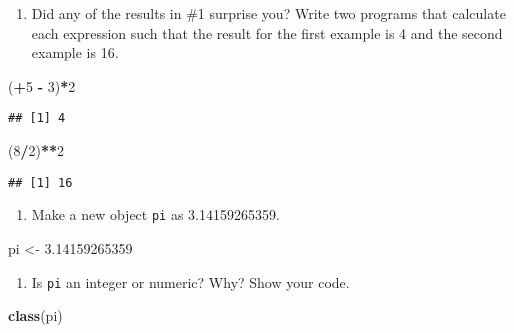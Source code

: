 \documentclass[]{article}
\newenvironment{Shaded}{\begin{snugshade}}{\end{snugshade}}
\newcommand{\DecValTok}[1]{\textcolor[rgb]{0.00,0.00,0.81}{#1}}
\newcommand{\FloatTok}[1]{\textcolor[rgb]{0.00,0.00,0.81}{#1}}
\newcommand{\KeywordTok}[1]{\textcolor[rgb]{0.13,0.29,0.53}{\textbf{#1}}}
\newcommand{\NormalTok}[1]{#1}
\newcommand{\OperatorTok}[1]{\textcolor[rgb]{0.81,0.36,0.00}{\textbf{#1}}}
\newcommand{\StringTok}[1]{\textcolor[rgb]{0.31,0.60,0.02}{#1}}
\providecommand{\tightlist}{%
  \setlength{\itemsep}{0pt}\setlength{\parskip}{0pt}}
\begin{document}
\begin{enumerate}
\def\labelenumi{\arabic{enumi}.}
\setcounter{enumi}{1}
\tightlist
\item
  Did any of the results in \#1 surprise you? Write two programs that
  calculate each expression such that the result for the first example
  is 4 and the second example is 16.
\end{enumerate}

\begin{Shaded}
\begin{Highlighting}[]
\NormalTok{(}\OperatorTok{+}\DecValTok{5} \OperatorTok{-}\StringTok{ }\DecValTok{3}\NormalTok{)}\OperatorTok{*}\DecValTok{2}
\end{Highlighting}
\end{Shaded}

\begin{verbatim}
## [1] 4
\end{verbatim}

\begin{Shaded}
\begin{Highlighting}[]
\NormalTok{(}\DecValTok{8}\OperatorTok{/}\DecValTok{2}\NormalTok{)}\OperatorTok{**}\DecValTok{2}
\end{Highlighting}
\end{Shaded}

\begin{verbatim}
## [1] 16
\end{verbatim}

\begin{enumerate}
\def\labelenumi{\arabic{enumi}.}
\setcounter{enumi}{2}
\tightlist
\item
  Make a new object \texttt{pi} as 3.14159265359.
\end{enumerate}

\begin{Shaded}
\begin{Highlighting}[]
\NormalTok{pi <-}\StringTok{  }\FloatTok{3.14159265359}
\end{Highlighting}
\end{Shaded}

\begin{enumerate}
\def\labelenumi{\arabic{enumi}.}
\setcounter{enumi}{3}
\tightlist
\item
  Is \texttt{pi} an integer or numeric? Why? Show your code.
\end{enumerate}

\begin{Shaded}
\begin{Highlighting}[]
\KeywordTok{class}\NormalTok{(pi)}
\end{Highlighting}
\end{Shaded}
\end{document}
